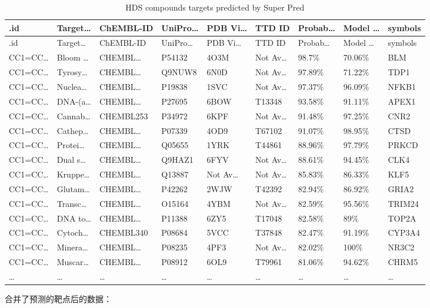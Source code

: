 \documentclass[
]{article}
\begin{document}
\begin{longtable}[]{@{}lllllllll@{}}
\caption{\label{tab:HDS-compounds-targets-predicted-by-Super-Pred}HDS compounds targets predicted by Super Pred}\tabularnewline
\toprule
.id & Target\ldots{} & ChEMBL-ID & UniPro\ldots{} & PDB Vi\ldots{} & TTD ID & Probab\ldots{} & Model \ldots{} & symbols\tabularnewline
\midrule
\endfirsthead
\toprule
.id & Target\ldots{} & ChEMBL-ID & UniPro\ldots{} & PDB Vi\ldots{} & TTD ID & Probab\ldots{} & Model \ldots{} & symbols\tabularnewline
\midrule
\endhead
CC1=CC\ldots{} & Bloom \ldots{} & CHEMBL\ldots{} & P54132 & 4O3M & Not Av\ldots{} & 98.7\% & 70.06\% & BLM\tabularnewline
CC1=CC\ldots{} & Tyrosy\ldots{} & CHEMBL\ldots{} & Q9NUW8 & 6N0D & Not Av\ldots{} & 97.89\% & 71.22\% & TDP1\tabularnewline
CC1=CC\ldots{} & Nuclea\ldots{} & CHEMBL\ldots{} & P19838 & 1SVC & Not Av\ldots{} & 97.37\% & 96.09\% & NFKB1\tabularnewline
CC1=CC\ldots{} & DNA-(a\ldots{} & CHEMBL\ldots{} & P27695 & 6BOW & T13348 & 93.58\% & 91.11\% & APEX1\tabularnewline
CC1=CC\ldots{} & Cannab\ldots{} & CHEMBL253 & P34972 & 6KPF & Not Av\ldots{} & 91.48\% & 97.25\% & CNR2\tabularnewline
CC1=CC\ldots{} & Cathep\ldots{} & CHEMBL\ldots{} & P07339 & 4OD9 & T67102 & 91.07\% & 98.95\% & CTSD\tabularnewline
CC1=CC\ldots{} & Protei\ldots{} & CHEMBL\ldots{} & Q05655 & 1YRK & T44861 & 88.96\% & 97.79\% & PRKCD\tabularnewline
CC1=CC\ldots{} & Dual s\ldots{} & CHEMBL\ldots{} & Q9HAZ1 & 6FYV & Not Av\ldots{} & 88.61\% & 94.45\% & CLK4\tabularnewline
CC1=CC\ldots{} & Kruppe\ldots{} & CHEMBL\ldots{} & Q13887 & Not Av\ldots{} & Not Av\ldots{} & 85.83\% & 86.33\% & KLF5\tabularnewline
CC1=CC\ldots{} & Glutam\ldots{} & CHEMBL\ldots{} & P42262 & 2WJW & T42392 & 82.94\% & 86.92\% & GRIA2\tabularnewline
CC1=CC\ldots{} & Transc\ldots{} & CHEMBL\ldots{} & O15164 & 4YBM & Not Av\ldots{} & 82.59\% & 95.56\% & TRIM24\tabularnewline
CC1=CC\ldots{} & DNA to\ldots{} & CHEMBL\ldots{} & P11388 & 6ZY5 & T17048 & 82.58\% & 89\% & TOP2A\tabularnewline
CC1=CC\ldots{} & Cytoch\ldots{} & CHEMBL340 & P08684 & 5VCC & T37848 & 82.47\% & 91.19\% & CYP3A4\tabularnewline
CC1=CC\ldots{} & Minera\ldots{} & CHEMBL\ldots{} & P08235 & 4PF3 & Not Av\ldots{} & 82.02\% & 100\% & NR3C2\tabularnewline
CC1=CC\ldots{} & Muscar\ldots{} & CHEMBL\ldots{} & P08912 & 6OL9 & T79961 & 81.06\% & 94.62\% & CHRM5\tabularnewline
\ldots{} & \ldots{} & \ldots{} & \ldots{} & \ldots{} & \ldots{} & \ldots{} & \ldots{} & \ldots{}\tabularnewline
\bottomrule
\end{longtable}

合并了预测的靶点后的数据：
\end{document}
